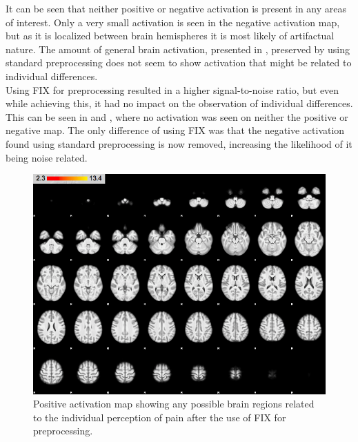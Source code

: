 It can be seen that neither positive or negative activation is present in any areas of interest. Only a very small activation is seen in the negative activation map, but as it is localized between brain hemispheres it is most likely of artifactual nature. The amount of general brain activation, presented in , preserved by using standard preprocessing does not seem to show activation that might be related to individual differences. \\
Using FIX for preprocessing resulted in a higher signal-to-noise ratio, but even while achieving this, it had no impact on the observation of individual differences. This can be seen in  and , where no activation was seen on neither the positive or negative map. The only difference of using FIX was that the negative activation found using standard preprocessing is now removed, increasing the likelihood of it being noise related. 

\begin{figure}[H]                 
	\includegraphics[width=.65\textwidth]{figures/Results/FIX_pos_ID}  
	\caption{Positive activation map showing any possible brain regions related to the individual perception of pain after the use of FIX for preprocessing.}
	\label{FIX_pos_ID} 
\end{figure}

